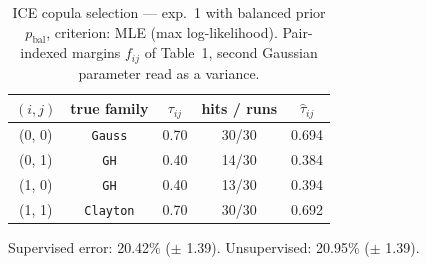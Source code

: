 \begin{table}[htbp]
  \centering
  \caption{ICE copula selection — exp.\ 1 with balanced prior $p_{\text{bal}}$, criterion: MLE (max log-likelihood). Pair-indexed margins $f_{ij}$ of Table~1, second Gaussian parameter read as a variance.}
  \label{tab:exp3-exp1_bal_p__mle}
  \begin{tabular}{ccccc}
    \toprule
    $(i, j)$ & true family & $\tau_{ij}$ & hits / runs & $\hat\tau_{ij}$ \\
    \midrule
    (0, 0) & \texttt{Gauss} & 0.70 & 30/30 & 0.694 \\
    (0, 1) & \texttt{GH} & 0.40 & 14/30 & 0.384 \\
    (1, 0) & \texttt{GH} & 0.40 & 13/30 & 0.394 \\
    (1, 1) & \texttt{Clayton} & 0.70 & 30/30 & 0.692 \\
    \bottomrule
  \end{tabular}
  \par\smallskip Supervised error: 20.42\% ($\pm$ 1.39). Unsupervised: 20.95\% ($\pm$ 1.39).
\end{table}
